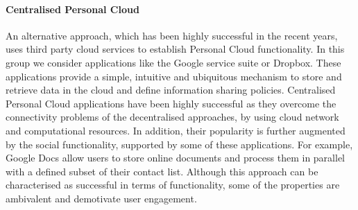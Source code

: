 \paragraph*{Centralised Personal Cloud}

An alternative approach, which has been highly successful in the recent years,
uses third party cloud services to establish Personal Cloud functionality.  In
this group we consider applications like the Google service suite or Dropbox.
These applications provide a simple, intuitive and ubiquitous mechanism to
store and retrieve data in the cloud and define information sharing policies.
Centralised Personal Cloud applications have been highly successful as they
overcome the connectivity problems of the decentralised approaches, by using
cloud network and computational resources. In addition, their popularity is
further augmented by the social functionality, supported by some of these
applications. For example, Google Docs allow users to store online documents and
process them in parallel with a defined subset of their contact list.  Although
this approach can be characterised as successful in terms of functionality, some
of the properties are ambivalent and demotivate user engagement. 

